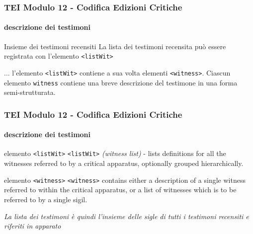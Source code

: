 \begin{frame}
    \frametitle{TEI Modulo 12 - Codifica Edizioni Critiche}
    \framesubtitle{descrizione dei testimoni}
    \addtocounter{nframe}{1}





    
    \begin{block}{Insieme dei testimoni recensiti}
        La lista dei testimoni recensita può essere registrata con l'elemento \texttt{<listWit>}
    \end{block}

    \begin{center}{...}
        l'elemento \texttt{<listWit>} contiene a sua volta elementi \texttt{<witness>}. Ciascun elemento \texttt{witness} contiene una breve descrizione del testimone in una forma semi-strutturata. 
    \end{center}
    
   
\end{frame}


\begin{frame}
    \frametitle{TEI Modulo 12 - Codifica Edizioni Critiche}
    \framesubtitle{descrizione dei testimoni}
    \addtocounter{nframe}{1}

    
    \begin{block}{elemento \texttt{<listWit>}}
        \texttt{<listWit>} \textit{(witness list)} - lists definitions for all the witnesses referred to by a critical apparatus, optionally grouped hierarchically.
    \end{block}

    \begin{center}{elemento \texttt{<witness>}}
        \texttt{<witness>} contains either a description of a single witness referred to within the critical apparatus, or a list of witnesses which is to be referred to by a single sigil.
    \end{center}
    
    \textit{La lista dei testimoni è quindi l'insieme delle sigle di tutti i testimoni recensiti e riferiti in apparato}
   
\end{frame}


